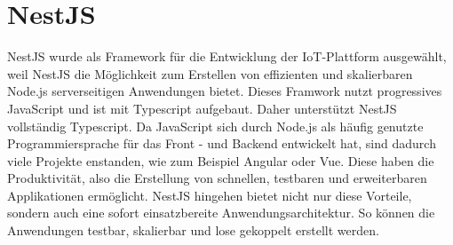 \section{NestJS}
NestJS wurde als Framework für die Entwicklung der IoT-Plattform ausgewählt, weil NestJS die Möglichkeit zum Erstellen von effizienten und skalierbaren Node.js serverseitigen Anwendungen bietet. Dieses Framwork nutzt progressives JavaScript und ist mit Typescript aufgebaut. Daher unterstützt NestJS vollständig Typescript. Da JavaScript sich durch Node.js als häufig genutzte Programmiersprache für das Front - und Backend entwickelt hat, sind dadurch viele Projekte enstanden, wie zum Beispiel Angular oder Vue. Diese haben die Produktivität, also die Erstellung von schnellen, testbaren und erweiterbaren Applikationen ermöglicht. NestJS hingehen bietet nicht nur diese Vorteile, sondern auch eine sofort einsatzbereite Anwendungsarchitektur. So können die Anwendungen testbar, skalierbar und lose gekoppelt erstellt werden. \cite{nestjs} 
